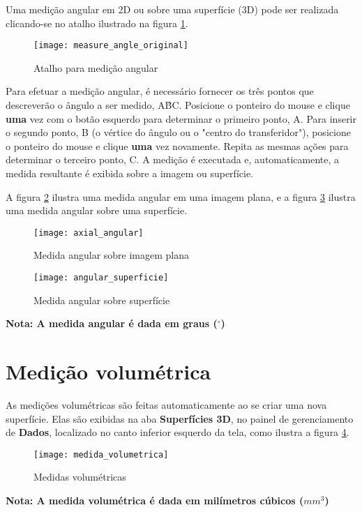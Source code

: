 Uma medição angular em 2D ou sobre uma superfície (3D) pode ser realizada clicando-se
no atalho ilustrado na figura \ref{fig:atalho_angular}.

\begin{figure}[!htb]
\centering
\texttt{[image: measure\_angle\_original]}
\caption{Atalho para medição angular}
\label{fig:atalho_angular}
\end{figure}

Para efetuar a medição angular, é necessário fornecer os três pontos que descreverão o
ângulo a ser medido, A\^{B}C. Posicione o ponteiro do mouse e clique \textbf{uma} vez
com o botão esquerdo para determinar o primeiro ponto, A. Para inserir o segundo ponto,
B (o vértice do ângulo ou o "centro do transferidor"), posicione o ponteiro do mouse e
clique \textbf{uma} vez novamente. Repita as mesmas ações para determinar o terceiro
ponto, C. A medição é executada e, automaticamente, a medida resultante é exibida sobre
a imagem ou superfície.

A figura \ref{fig:axial_angular} ilustra uma medida angular em uma imagem plana, e a
figura \ref{fig:axial_superficie} ilustra uma medida angular sobre uma superfície.

\begin{figure}[!htb]
\centering
\texttt{[image: axial\_angular]}
\caption{Medida angular sobre imagem plana}
\label{fig:axial_angular}
\end{figure}

\begin{figure}[!htb]
\centering
\texttt{[image: angular\_superficie]}
\caption{Medida angular sobre superfície}
\label{fig:axial_superficie}
\end{figure}

\textbf{Nota: A medida angular é dada em graus ($^{\circ}$)}


\section{Medição volumétrica}

As medições volumétricas são feitas automaticamente ao se criar uma nova superfície.
Elas são exibidas na aba \textbf{Superfícies 3D}, no painel de gerenciamento de \textbf{Dados}, localizado no canto
inferior esquerdo da tela, como ilustra a figura \ref{fig:volumetric_mensure}.

\begin{figure}[!htb]
\centering
\texttt{[image: medida\_volumetrica]}
\caption{Medidas volumétricas}
\label{fig:volumetric_mensure}
\end{figure}

\textbf{Nota: A medida volumétrica é dada em milímetros cúbicos ($mm^3$)}
